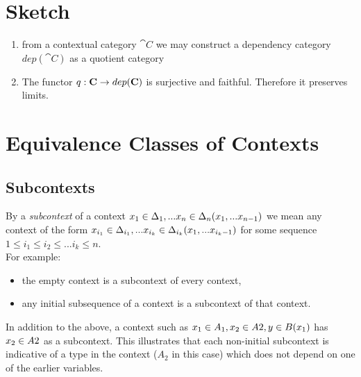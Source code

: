 \documentclass[10pt,a4paper]{scrartcl}
\begin{document}
\newpage

\section{Sketch}
\begin{enumerate}
\item{
from a contextual category $\cat{C}$ we may construct a dependency category $dep(\cat{C})$ as a quotient category
}
\item{
The functor $q:\textbf{C} \rightarrow dep(\textbf{C})$ is surjective and faithful.
Therefore it preserves limits.
}
\end{enumerate}




\section{Equivalence Classes of Contexts}
\subsection{Subcontexts}
By a \textit{subcontext} of a context $x_1 \in \Delta_1,... x_{n} \in \Delta_{n}(x_1,...x_{n-1})$ we mean any context
of the form
$x_{i_1} \in {\Delta}_{i_1},... x_{i_k} \in {\Delta}_{i_k}(x_1,...x_{i_k-1})$ for some sequence 
$1 \leq i_1 \leq i_2 \leq ... i_k \leq n$. \\

\noindent
For example:
\begin {itemize}
\item the empty context  is a subcontext of every 
context,
\item any initial subsequence of a context is a subcontext of that context.
\end{itemize}

\noindent
In addition to the above, a context such as $x_1 \in A_1,x_2 \in A2,y \in B(x_1)$ has 
$x_2 \in A2$ as a subcontext. This illustrates that each non-initial subcontext is indicative of a type in the context ($A_2$ in this case)
which does not depend on one of the earlier variables.
 




\end{document}
